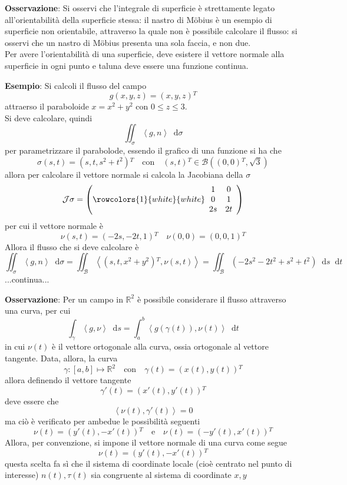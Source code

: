 \documentclass[a4paper]{extarticle}
\newcommand*\dif{\mathop{}\!\mathrm{d}}
\begin{document}
\vspace{2em}
\noindent
\textbf{Osservazione}: Si osservi che l'integrale di superficie è strettamente legato all'orientabilità della superficie stessa: il nastro di Möbius è un esempio di superficie non orientabile, attraverso la quale non è possibile calcolare il flusso: si osservi che un nastro di Möbius presenta una sola faccia, e non due.\\
Per avere l'orientabilità di una superficie, deve esistere il vettore normale alla superficie in ogni punto e taluna deve essere una funzione continua.

\vspace{2em}
\textbf{Esempio}: Si calcoli il flusso del campo
\[g(x,y,z) = (x,y,z){^T}\]
attraerso il paraboloide $x=x^2+y^2$ con $0 \leq z \leq 3$.\\
Si deve calcolare, quindi
\[\iint_\sigma \left<g,n\right> \dif \sigma\]
per parametrizzare il parabolode, essendo il grafico di una funzione si ha che
\[\sigma(s,t) = (s,t,s^2+t^2){^T} \hspace{1em} \text{con} \hspace{1em} (s,t){^T} \in \mathcal{B} \left((0,0){^T}, \sqrt{3}\right)\]
allora per calcolare il vettore normale si calcola la Jacobiana della $\sigma$
\[
    \mathcal{J} \sigma = \left(
        \rowcolors{1}{white}{white}
        \begin{array}{cc}
            1 & 0\\
            0 & 1\\
            2s & 2t
        \end{array}
    \right)
\]
per cui il vettore normale è
\[\nu(s,t) = (-2s,-2t,1){^T} \hspace{1em} \nu(0,0)=(0,0,1){^T}\]
Allora il flusso che si deve calcolare è
\[\iint_\sigma \left<g,n\right> \dif \sigma = \iint_\mathcal{B} \left<(s,t,x^2+y^2){^T},\nu(s,t)\right>=\iint_\mathcal{B} (-2s^2-2t^2+s^2+t^2) \dif s \dif t\]
...continua...

\vspace{2em}
\noindent
\textbf{Osservazione}: Per un campo in $\mathbb{R}^2$ è possibile considerare il flusso attraverso una curva, per cui
\[\int_\gamma \left<g,\nu\right> \dif s = \int_a^b \left<g(\gamma(t)), \nu(t)\right> \dif t\]
in cui $\nu(t)$ è il vettore ortogonale alla curva, ossia ortogonale al vettore tangente. Data, allora, la curva
\[\gamma : [a,b] \longmapsto \mathbb{R}^2 \hspace{1em} \text{con} \hspace{1em} \gamma(t)=\left(x(t),y(t)\right){^T}\]
allora definendo il vettore tangente
\[\gamma'(t)=\left(x'(t),y'(t)\right){^T}\]
deve essere che
\[\left<\nu(t),\gamma'(t)\right>=0\]
ma ciò è verificato per ambedue le possibilità seguenti
\[\nu(t) = \left(y'(t),-x'(t)\right){^T} \hspace{1em} \text{e} \hspace{1em} \nu(t)=\left(-y'(t),x'(t)\right){^T}\]
Allora, per convenzione, si impone il vettore normale di una curva come segue
\[\boxed{\nu(t)=\left(y'(t),-x'(t)\right){^T}}\]
questa scelta fa sì che il sistema di coordinate locale (cioè centrato nel punto di interesse) $n(t),\tau(t)$ sia congruente al sistema di coordinate $x,y$
\end{document}
